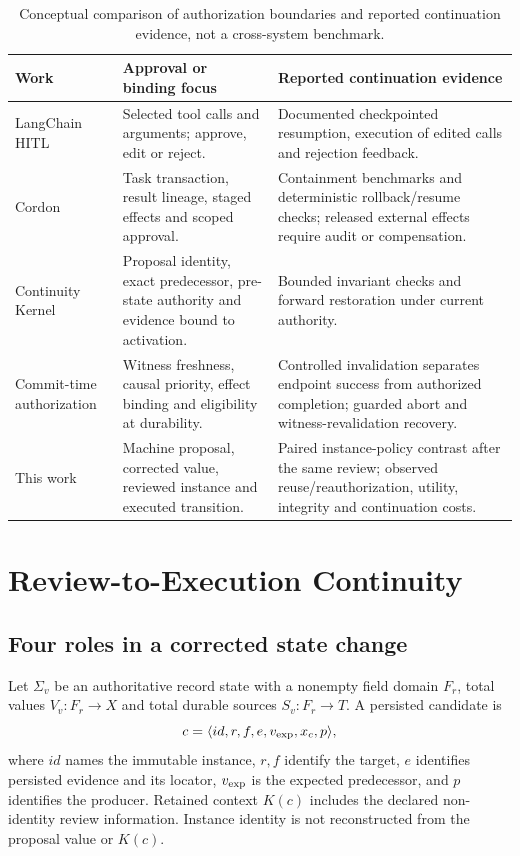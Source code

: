 \documentclass[10pt,a4paper,twocolumn]{article}
\begin{document}
\begin{table}[t]
\centering
\small
\caption{Conceptual comparison of authorization boundaries and reported continuation evidence, not a cross-system benchmark.}
\label{tab:authorization-comparison}
\begin{tabularx}{\textwidth}{@{}>{\raggedright\arraybackslash}p{}>{\raggedright\arraybackslash}p{}>{\raggedright\arraybackslash}X@{}}
\toprule
Work & Approval or binding focus & Reported continuation evidence \\
\midrule
LangChain HITL \citep{langchainHITL} &
Selected tool calls and arguments; approve, edit or reject. &
Documented checkpointed resumption, execution of edited calls and rejection feedback. \\
\addlinespace
Cordon \citep{chen2026cordon} &
Task transaction, result lineage, staged effects and scoped approval. &
Containment benchmarks and deterministic rollback/resume checks; released external effects require audit or compensation. \\
\addlinespace
Continuity Kernel \citep{he2026continuity} &
Proposal identity, exact predecessor, pre-state authority and evidence bound to activation. &
Bounded invariant checks and forward restoration under current authority. \\
\addlinespace
Commit-time authorization \citep{santosgrueiro2026committime} &
Witness freshness, causal priority, effect binding and eligibility at durability. &
Controlled invalidation separates endpoint success from authorized completion; guarded abort and witness-revalidation recovery. \\
\addlinespace
This work &
Machine proposal, corrected value, reviewed instance and executed transition. &
Paired instance-policy contrast after the same review; observed reuse/reauthorization, utility, integrity and continuation costs. \\
\bottomrule
\end{tabularx}
\end{table}

\section{Review-to-Execution \mbox{Continuity}}
\subsection{Four roles in a corrected state change}
Let $\Sigma_v$ be an authoritative record state with a nonempty field domain $F_r$, total values $V_v:F_r\to X$ and total durable sources $S_v:F_r\to T$. A persisted candidate is
\begin{equation}
c=\langle id,r,f,e,v_{\rm exp},x_c,p\rangle,
\end{equation}
where $id$ names the immutable instance, $r,f$ identify the target, $e$ identifies persisted evidence and its locator, $v_{\rm exp}$ is the expected predecessor, and $p$ identifies the producer. Retained context $K(c)$ includes the declared non-identity review information. Instance identity is not reconstructed from the proposal value or $K(c)$.
\end{document}
